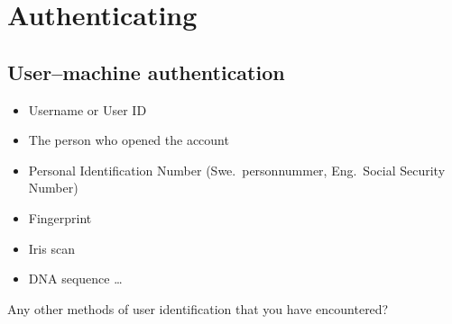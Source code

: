 \begin{frame}
  \titlepage{}
\end{frame}





\section{Authenticating}

\subsection{User--machine authentication}

\begin{frame}
  \begin{example}[Identifiers]
    \begin{itemize}
      \item Username or User ID
      \item The person who opened the account
      \item Personal Identification Number (Swe.\ personnummer, Eng.\ Social 
        Security Number)

        \pause{}

      \item Fingerprint
      \item Iris scan
      \item DNA sequence \dots
    \end{itemize}
  \end{example}

  \pause{}

  \begin{exercise}
    Any other methods of user identification that you have encountered?
  \end{exercise}
\end{frame}

